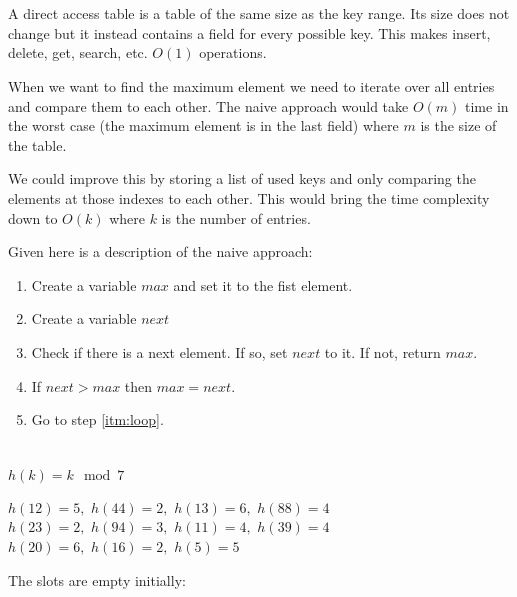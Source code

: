 \documentclass[12pt]{article}
\begin{document}
\section{} %
A direct access table is a table of the same size as the key range. Its size does not change but it instead contains a field for every possible key. This makes insert, delete, get, search, etc. $O(1)$ operations.

When we want to find the maximum element we need to iterate over all entries and compare them to each other. The naive approach would take $O(m)$ time in the worst case (the maximum element is in the last field) where $m$ is the size of the table.

We could improve this by storing a list of used keys and only comparing the elements at those indexes to each other. This would bring the time complexity down to $O(k)$ where $k$ is the number of entries.

Given here is a description of the naive approach:

\begin{enumerate}
	\item Create a variable $max$ and set it to the fist element.
	\item Create a variable $next$
	\item \label{itm:loop} Check if there is a next element. If so, set $next$ to it. If not, return $max$.
	\item If $next > max$ then $max = next$.
	\item Go to step \ref{itm:loop}.
\end{enumerate}

\section{} %
$h(k) = k \mod 7$

$h(12) = 5,$ $h(44) = 2,$ $h(13) = 6,$ $h(88) = 4$\\
$h(23) = 2,$ $h(94) = 3,$ $h(11) = 4,$ $h(39) = 4$\\
$h(20) = 6,$ $h(16) = 2,$ $h(5) = 5$

The slots are empty initially:
\end{document}
